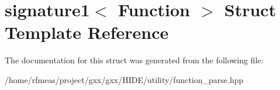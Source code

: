 \hypertarget{structsignature1}{}\section{signature1$<$ Function $>$ Struct Template Reference}
\label{structsignature1}


The documentation for this struct was generated from the following file\+:\begin{DoxyCompactItemize}
\item 
/home/rfmeas/project/gxx/gxx/\+H\+I\+D\+E/utility/function\+\_\+parse.\+hpp\end{DoxyCompactItemize}
